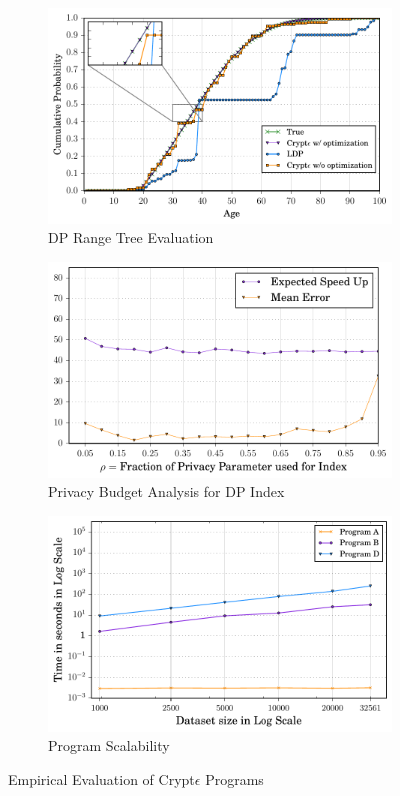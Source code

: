 \begin{figure}[ht]
    \begin{subfigure}[b]{0.25\linewidth}
     \includegraphics[width=1\linewidth]{cdf_final.pdf}
        \caption{DP Range Tree Evaluation}
        \end{subfigure}
        \begin{subfigure}[b]{0.25\linewidth}
     \includegraphics[width=1\linewidth]{index_final.pdf}
        \caption{Privacy Budget Analysis for DP Index}
        \label{Index}
    \end{subfigure}
    \begin{subfigure}[b]{0.25\linewidth}
     \includegraphics[width=1\linewidth]{scale_fin.pdf}
        \caption{\system Program Scalability}
        \label{Scale}
    \end{subfigure}
   \caption{Empirical Evaluation of Crypt$\epsilon$ Programs}
\end{figure}

